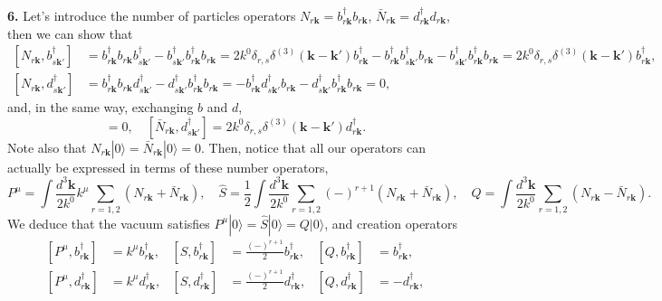 \textbf{6.} Let's introduce the number of particles operators $N_{r\mathbf{k}} = b^\dagger_{r\mathbf{k}} b_{r\mathbf{k}}$, $\bar{N}_{r\mathbf{k}} = d^\dagger_{r\mathbf{k}} d_{r\mathbf{k}}$, then we can show that
\begin{equation}
\begin{aligned}
    [N_{r\mathbf{k}}, b^\dagger_{s\mathbf{k}'}] &= b^\dagger_{r\mathbf{k}} b_{r\mathbf{k}} b^\dagger_{s\mathbf{k}'} - b^\dagger_{s\mathbf{k}'} b^\dagger_{r\mathbf{k}} b_{r\mathbf{k}} = 2k^0 \delta_{r,s} \delta^{(3)}(\mathbf{k}-\mathbf{k}') b^\dagger_{r\mathbf{k}} - b^\dagger_{r\mathbf{k}} b^\dagger_{s\mathbf{k}'} b_{r\mathbf{k}} - b^\dagger_{s\mathbf{k}'} b^\dagger_{r\mathbf{k}} b_{r\mathbf{k}} = 2k^0 \delta_{r,s} \delta^{(3)}(\mathbf{k}-\mathbf{k}') b^\dagger_{r\mathbf{k}}, \\
    [N_{r\mathbf{k}}, d^\dagger_{s\mathbf{k}'}] &= b^\dagger_{r\mathbf{k}} b_{r\mathbf{k}} d^\dagger_{s\mathbf{k}'} - d^\dagger_{s\mathbf{k}'} b^\dagger_{r\mathbf{k}} b_{r\mathbf{k}} = -b^\dagger_{r\mathbf{k}} d^\dagger_{s\mathbf{k}'} b_{r\mathbf{k}} - d^\dagger_{s\mathbf{k}'} b^\dagger_{r\mathbf{k}} b_{r\mathbf{k}} = 0,
\end{aligned}
\end{equation}
and, in the same way, exchanging $b$ and $d$,
\begin{equation}
    [\bar{N}_{r\mathbf{k}}, b^\dagger_{s\mathbf{k}'}] = 0, \quad [\bar{N}_{r\mathbf{k}}, d^\dagger_{s\mathbf{k}'}] = 2k^0 \delta_{r,s} \delta^{(3)}(\mathbf{k}-\mathbf{k}') d^\dagger_{r\mathbf{k}}.
\end{equation}
Note also that $N_{r\mathbf{k}}|0\rangle = \bar{N}_{r\mathbf{k}}|0\rangle = 0$.
Then, notice that all our operators can actually be expressed in terms of these number operators,
\begin{equation}
    P^\mu = \int \frac{d^3\mathbf{k}}{2k^0} k^\mu \sum_{r=1,2} (N_{r\mathbf{k}} + \bar{N}_{r\mathbf{k}}), \quad \hat{S} = \frac{1}{2} \int \frac{d^3\mathbf{k}}{2k^0} \sum_{r=1,2} (-)^{r+1} (N_{r\mathbf{k}} + \bar{N}_{r\mathbf{k}}), \quad Q = \int \frac{d^3\mathbf{k}}{2k^0} \sum_{r=1,2} (N_{r\mathbf{k}} - \bar{N}_{r\mathbf{k}}).
\end{equation}
We deduce that the vacuum satisfies $P^\mu|0\rangle = \hat{S}|0\rangle = Q|0\rangle$, and creation operators
\begin{equation}
\begin{aligned}
    [P^\mu, b^\dagger_{r\mathbf{k}}] &= k^\mu b^\dagger_{r\mathbf{k}}, & [\hat{S}, b^\dagger_{r\mathbf{k}}] &= \frac{(-)^{r+1}}{2} b^\dagger_{r\mathbf{k}}, & [Q, b^\dagger_{r\mathbf{k}}] &= b^\dagger_{r\mathbf{k}}, \\
    [P^\mu, d^\dagger_{r\mathbf{k}}] &= k^\mu d^\dagger_{r\mathbf{k}}, & [\hat{S}, d^\dagger_{r\mathbf{k}}] &= \frac{(-)^{r+1}}{2} d^\dagger_{r\mathbf{k}}, & [Q, d^\dagger_{r\mathbf{k}}] &= -d^\dagger_{r\mathbf{k}},
\end{aligned}
\end{equation}

